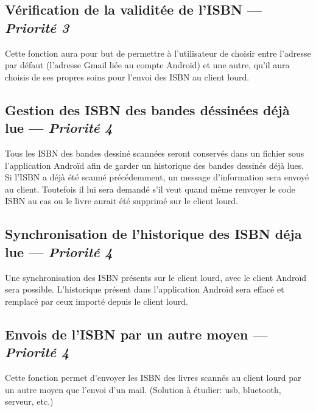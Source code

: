 \subsection[Envois du mail contenant l'ISBN via une autre adresse mail]{Vérification de la validitée de l'ISBN — \emph{Priorité 3}}
Cette fonction aura pour but de permettre à l'utilisateur de choisir entre l'adresse par défaut (l'adresse Gmail liée au compte Androïd) et une autre,
qu'il aura choisis de ses propres soins pour l'envoi des ISBN au client lourd. 


\subsection[Gestion des ISBN des bandes dessinées déjà lue]{Gestion des ISBN des bandes déssinées déjà lue — \emph{Priorité 4}}
Tous les ISBN des bandes dessiné scannées seront conservés dans un fichier sous l'application Androïd afin de garder un historique des bandes dessinés déjà lues. 
Si l'ISBN a déjà été scanné précédemment, un message d'information sera envoyé au client. 
Toutefois il lui sera demandé s'il veut quand même renvoyer le code ISBN au cas ou le livre aurait été supprimé sur le client lourd. 

\subsection[Synchronisation de l'historique des ISBN déja lue]{Synchronisation de l'historique des ISBN déja lue — \emph{Priorité 4}}
Une synchronisation des ISBN présents sur le client lourd, avec le client Androïd sera possible. 
L'historique présent dans l'application Androïd sera effacé et remplacé par ceux importé depuis le client lourd.

\subsection[Envois de l'ISBN par un autre moyen]{Envois de l'ISBN par un autre moyen — \emph{Priorité 4}}
Cette fonction permet d'envoyer les ISBN des livres scannés au client lourd par un autre moyen que l'envoi d'un mail. 
(Solution à étudier: usb, bluetooth, serveur, etc.)

